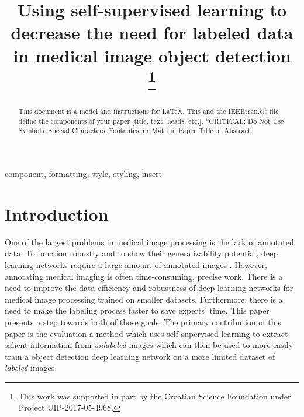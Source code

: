 \documentclass[conference]{IEEEtran}
\begin{document}
\title{Using self-supervised learning to decrease the need for labeled data in medical image object detection\\
\thanks{This work was supported in part by the Croatian Science Foundation under Project UIP-2017-05-4968.}
}

\author{ 
}

\maketitle

\begin{abstract}
This document is a model and instructions for \LaTeX.
This and the IEEEtran.cls file define the components of your paper [title, text, heads, etc.]. *CRITICAL: Do Not Use Symbols, Special Characters, Footnotes, 
or Math in Paper Title or Abstract.
\end{abstract}

\begin{IEEEkeywords}
component, formatting, style, styling, insert
\end{IEEEkeywords}



\section{Introduction}

One of the largest problems in medical image processing is the lack of annotated data. To function 
robustly and to show their generalizability potential, deep learning networks require a large 
amount of annotated images \cite{litjensSurveyDeepLearning2017}. However, 
annotating medical imaging is often time-consuming, precise work. There is a need to improve the 
data efficiency and robustness of deep learning networks for medical image processing
trained on smaller datasets. Furthermore, 
there is a need to make the labeling process faster to save experts' time. This paper presents a 
step towards both of those goals. The primary contribution of this paper is the evaluation a method 
which uses self-supervised learning 
to extract salient information from \textit{unlabeled} images which can then be used to more 
easily train a object detection deep learning network on a more limited dataset 
of \textit{labeled} images.
\end{document}
